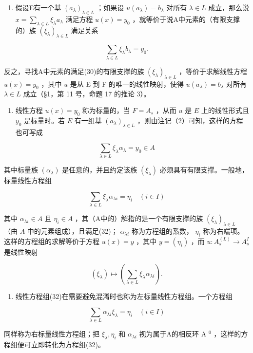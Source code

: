 \begin{enumerate}
\def\labelenumi{(\arabic{enumi})}
\setcounter{enumi}{1}
\tightlist
\item
  假设E有一个基 \((a_{\lambda})_{\lambda \in L}\) ；如果设 \(u(a_{\lambda}) = b_{\lambda}\) 对所有 \(\lambda \in L\) 成立，那么说 \(x = \sum_{\lambda \in L} \xi_{\lambda} a_{\lambda}\) 满足方程 \(u(x) = y_0\) ，就等价于说A中元素的（有限支撑的）族 \((\xi_{\lambda})_{\lambda \in L}\) 满足关系
\end{enumerate}

\[
\sum_ {\lambda \in L} \xi_ {\lambda} b _ {\lambda} = y _ {0}.\tag{30}
\]

反之，寻找A中元素的满足(30)的有限支撑的族 \((\xi_{\lambda})_{\lambda \in L}\) ，等价于求解线性方程 \(u(x) = y_0\) ，其中 \(u\) 是从 E 到 F 的唯一的线性映射，使得 \(u(a_{\lambda}) = b_{\lambda}\) 对所有 \(\lambda \in L\) 成立（§1，第 11 号，命题 17 的推论 3）。

\begin{enumerate}
\def\labelenumi{(\arabic{enumi})}
\setcounter{enumi}{2}
\tightlist
\item
  线性方程 \(u(x) = y_0\) 称为标量的，当 \(F = A_s\) ，从而 \(u\) 是 \(E\) 上的线性形式且 \(y_0\) 是标量时。若 \(E\) 有一组基 \((a_\lambda)_{\lambda \in L}\) ，则由注记（2）可知，这样的方程也可写成
\end{enumerate}

\[
\sum_ {\lambda \in L} \xi_ {\lambda} \alpha_ {\lambda} = y _ {0} \in A\tag{31}
\]

其中标量族 \((\alpha_{\lambda})\) 是任意的，并且约定该族 \((\xi_{\lambda})\) 必须具有有限支撑。一般地，标量线性方程组

\[
\sum_ {\lambda \in L} \xi_ {\lambda} \alpha_ {\lambda i} = \eta_ {i} \quad (i \in I)\tag{32}
\]

其中 \(\alpha_{\lambda i} \in A\) 且 \(\eta_i \in A\) ，其（A中的）解指的是一个有限支撑的族 \((\xi_\lambda)_{\lambda \in L}\) （由 \(A\) 中的元素组成），且满足(32)； \(\alpha_{\lambda i}\) 称为方程组的系数， \(\eta_i\) 称为右端项。这样的方程组的求解等价于方程 \(u(x) = y\) ，其中 \(y = (\eta_i)\) ，而 \(u: A_s^{(L)} \to A_s^I\) 是线性映射

\[
\left(\xi_ {\lambda}\right) \mapsto \left(\sum_ {\lambda \in L} \xi_ {\lambda} \alpha_ {\lambda i}\right).
\]

\begin{enumerate}
\def\labelenumi{(\arabic{enumi})}
\setcounter{enumi}{3}
\tightlist
\item
  线性方程组(32)在需要避免混淆时也称为左标量线性方程组。一个方程组
\end{enumerate}

\[
\sum_ {\lambda \in L} \alpha_ {\lambda i} \xi_ {\lambda} = \eta_ {i} \quad (i \in I)\tag{33}
\]

同样称为右标量线性方程组；把 \(\xi_{\lambda}, \eta_{i}\) 和 \(\alpha_{\lambda i}\) 视为属于A的相反环 A \(^{0}\) ，这样的方程组便可立即转化为方程组(32)。

